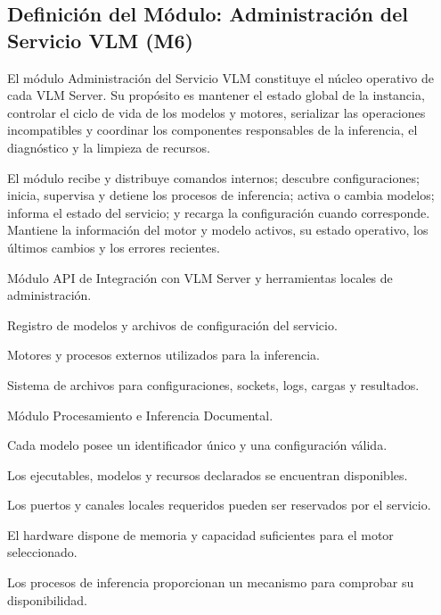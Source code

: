 
\subsection{Definición del Módulo: Administración del Servicio VLM (M6)}
\label{subsec:modulo_m6}

\begin{definicionmodulo}

\item[Propósito] El módulo Administración del Servicio VLM constituye el núcleo operativo de cada VLM Server. Su propósito es mantener el estado global de la instancia, controlar el ciclo de vida de los modelos y motores, serializar las operaciones incompatibles y coordinar los componentes responsables de la inferencia, el diagnóstico y la limpieza de recursos.

\item[Alcance] El módulo recibe y distribuye comandos internos; descubre configuraciones; inicia, supervisa y detiene los procesos de inferencia; activa o cambia modelos; informa el estado del servicio; y recarga la configuración cuando corresponde. Mantiene la información del motor y modelo activos, su estado operativo, los últimos cambios y los errores recientes.

\item[Dependencias]
\begin{elementosmodulo}
    \item Módulo API de Integración con VLM Server y herramientas locales de administración.
    \item Registro de modelos y archivos de configuración del servicio.
    \item Motores y procesos externos utilizados para la inferencia.
    \item Sistema de archivos para configuraciones, sockets, logs, cargas y resultados.
    \item Módulo Procesamiento e Inferencia Documental.
\end{elementosmodulo}

\item[Supuestos]
\begin{elementosmodulo}
    \item Cada modelo posee un identificador único y una configuración válida.
    \item Los ejecutables, modelos y recursos declarados se encuentran disponibles.
    \item Los puertos y canales locales requeridos pueden ser reservados por el servicio.
    \item El hardware dispone de memoria y capacidad suficientes para el motor seleccionado.
    \item Los procesos de inferencia proporcionan un mecanismo para comprobar su disponibilidad.
\end{elementosmodulo}


\end{definicionmodulo}
